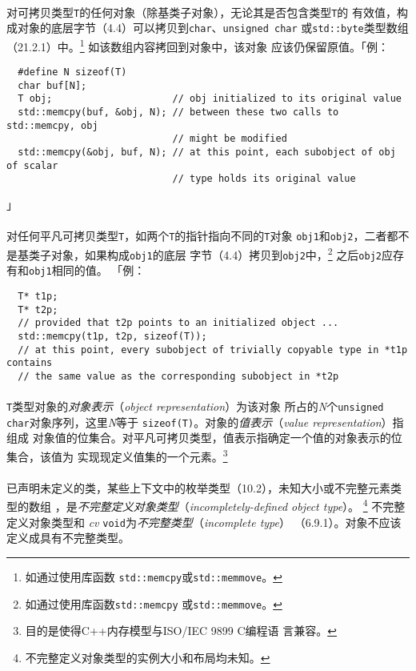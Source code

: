 \paragraph{}
对可拷贝类型\texttt{T}的任何对象（除基类子对象），无论其是否包含类型\texttt{T}的
有效值，构成对象的底层字节（4.4）可以拷贝到\texttt{char}、\texttt{unsigned char}
或\texttt{std::byte}类型数组（21.2.1）中。\footnote{如通过使用库函数
\texttt{std::memcpy}或\texttt{std::memmove}。} 如该数组内容拷回到对象中，该对象
应该仍保留原值。「例：
\begin{lstlisting}
  #define N sizeof(T)
  char buf[N];
  T obj;                     // obj initialized to its original value
  std::memcpy(buf, &obj, N); // between these two calls to std::memcpy, obj
                             // might be modified
  std::memcpy(&obj, buf, N); // at this point, each subobject of obj of scalar
                             // type holds its original value
\end{lstlisting}」

\paragraph{}
对任何平凡可拷贝类型\texttt{T}，如两个\texttt{T}的指针指向不同的\texttt{T}对象
\texttt{obj1}和\texttt{obj2}，二者都不是基类子对象，如果构成\texttt{obj1}的底层
字节（4.4）拷贝到\texttt{obj2}中，\footnote{如通过使用库函数\texttt{std::memcpy}
或\texttt{std::memmove}。} 之后\texttt{obj2}应存有和\texttt{obj1}相同的值。
「例：
\begin{lstlisting}
  T* t1p;
  T* t2p;
  // provided that t2p points to an initialized object ...
  std::memcpy(t1p, t2p, sizeof(T));
  // at this point, every subobject of trivially copyable type in *t1p contains
  // the same value as the corresponding subobject in *t2p
\end{lstlisting}

\paragraph{}
\texttt{T}类型对象的\textit{对象表示}（\textit{object representation}）为该对象
所占的\textit{N}个\texttt{unsigned char}对象序列，这里\textit{N}等于
\texttt{sizeof(T)}。对象的\textit{值表示}（\textit{value representation}）指组成
对象值的位集合。对平凡可拷贝类型，值表示指确定一个值的对象表示的位集合，该值为
实现现定义值集的一个元素。\footnote{目的是使得C++内存模型与ISO/IEC 9899 C编程语
言兼容。}

\paragraph{}
已声明未定义的类，某些上下文中的枚举类型（10.2），未知大小或不完整元素类型的数组
，是\textit{不完整定义对象类型}（\textit{incompletely-defined object type}）。
\footnote{不完整定义对象类型的实例大小和布局均未知。} 不完整定义对象类型和
\textit{cv} \texttt{void}为\textit{不完整类型}（\textit{incomplete type}）
（6.9.1）。对象不应该定义成具有不完整类型。

